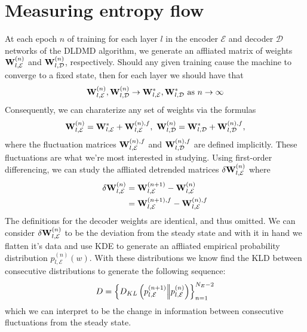 \section{Measuring entropy flow}
At each epoch $n$ of training for each layer $l$ in the encoder $\mathcal{E}$ and 
decoder $\mathcal{D}$ networks of the DLDMD algorithm, we generate an affliated matrix 
of weights ${\bf W}_{l,\mathcal{E}}^{(n)}$ and ${\bf W}_{l,\mathcal{D}}^{(n)}$, respectively.
Should any given training cause the machine to converge to a fixed state, then for each layer
we should have that
\begin{equation}
    {\bf W}_{l,\mathcal{E}}^{(n)}, {\bf W}_{l,\mathcal{D}}^{(n)} \to 
    {\bf W}_{l,\mathcal{E}}^{*}, {\bf W}_{l,\mathcal{D}}^{*} \text{ as }
    n \to \infty \label{eqn:weight convergence}
\end{equation}
Consequently, we can charaterize any set of weights via the formulas
\begin{equation}
    {\bf W}_{l,\mathcal{E}}^{(n)} = {\bf W}_{l,\mathcal{E}}^{*} + {\bf W}_{l,\mathcal{E}}^{(n),f},\
    {\bf W}_{l,\mathcal{D}}^{(n)} = {\bf W}_{l,\mathcal{D}}^{*} + {\bf W}_{l,\mathcal{D}}^{(n),f},
\end{equation}
where the fluctuation matrices ${\bf W}_{l,\mathcal{E}}^{(n),f}$ and 
${\bf W}_{l,\mathcal{D}}^{(n),f}$ are defined implicitly. These fluctuations are what we're 
most interested in studying. Using first-order differencing, we can study the affliated 
detrended matrices $\delta{\bf W}_{l,\mathcal{E}}^{(n)}$ where
\begin{align*}
    \delta{\bf W}_{l,\mathcal{E}}^{(n)} &= {\bf W}_{l,\mathcal{E}}^{(n+1)} - {\bf W}_{l,\mathcal{E}}^{(n)} \\
    &= {\bf W}_{l,\mathcal{E}}^{(n+1),f} - {\bf W}_{l,\mathcal{E}}^{(n),f}
\end{align*}
The definitions for the decoder weights are identical, and thus omitted. We can consider 
$\delta{\bf W}_{l,\mathcal{E}}^{(n)}$ to be the deviation from the steady state and with it 
in hand we flatten it's data and use KDE to generate an affliated empirical probability 
distribution $p_{l,\mathcal{E}}^{(n)}(w)$. With these distributions we know find the KLD 
between consecutive distributions to generate the following sequence: 
\begin{equation}
    D = \left\{D_{KL}\left(p_{l,\mathcal{E}}^{(n+1)} \Big|\!\Big| p_{l,\mathcal{E}}^{(n)}\right)\right\}_{n=1}^{N_E - 2}
\end{equation}
which we can interpret to be the change in information between consecutive fluctuations from the 
steady state.

